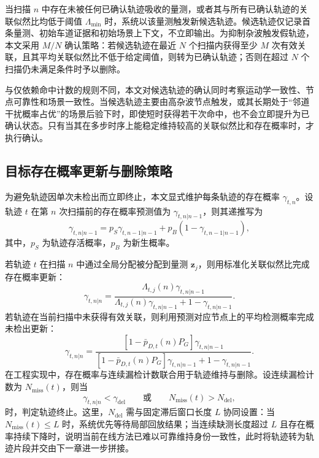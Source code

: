 \documentclass{xdupgthesis}
\begin{document}
当扫描 $n$ 中存在未被任何已确认轨迹吸收的量测，或者其与所有已确认轨迹的关联似然比均低于阈值 $\Lambda_{\min}$ 时，系统以该量测触发新候选轨迹。候选轨迹仅记录首条量测、初始车道证据和初始场景上下文，不立即输出。为抑制杂波触发假轨迹，本文采用 $M/N$ 确认策略：若候选轨迹在最近 $N$ 个扫描内获得至少 $M$ 次有效关联，且其平均关联似然比不低于给定阈值，则转为已确认轨迹；否则在超过 $N$ 个扫描仍未满足条件时予以删除。

与仅依赖命中计数的规则不同，本文对候选轨迹的确认同时考察运动学一致性、节点可靠性和场景一致性。当候选轨迹主要由高杂波节点触发，或其长期处于“邻道干扰概率占优”的场景后验下时，即使短时获得若干次命中，也不会立即提升为已确认状态。只有当其在多步时序上能稳定维持较高的关联似然比和存在概率时，才执行确认。

\subsection{目标存在概率更新与删除策略}

为避免轨迹因单次未检出而立即终止，本文显式维护每条轨迹的存在概率 $\gamma_{t,n}$。设轨迹 $t$ 在第 $n$ 次扫描前的存在概率预测值为 $\gamma_{t,n|n-1}$，则其递推写为
\begin{equation}
	\gamma_{t,n|n-1}=p_S\gamma_{t,n-1|n-1}+p_B\left(1-\gamma_{t,n-1|n-1}\right),
	\label{eq:ch3_exist_predict_v2}
\end{equation}
其中，$p_S$ 为轨迹存活概率，$p_B$ 为新生概率。

若轨迹 $t$ 在扫描 $n$ 中通过全局分配被分配到量测 $\mathbf z_j$，则用标准化关联似然比完成存在概率更新：
\begin{equation}
	\gamma_{t,n|n}=
	\frac{\Lambda_{t,j}(n)\gamma_{t,n|n-1}}{\Lambda_{t,j}(n)\gamma_{t,n|n-1}+1-\gamma_{t,n|n-1}}.
	\label{eq:ch3_exist_hit_v2}
\end{equation}
若轨迹在当前扫描中未获得有效关联，则利用预测对应节点上的平均检测概率完成未检出更新：
\begin{equation}
	\gamma_{t,n|n}=
	\frac{\left[1-\bar p_{D,t}(n)P_G\right]\gamma_{t,n|n-1}}{\left[1-\bar p_{D,t}(n)P_G\right]\gamma_{t,n|n-1}+1-\gamma_{t,n|n-1}}.
	\label{eq:ch3_exist_miss_v2}
\end{equation}
在工程实现中，存在概率与连续漏检计数联合用于轨迹维持与删除。设连续漏检计数为 $N_{\mathrm{miss}}(t)$，则当
\begin{equation}
	\gamma_{t,n|n}<\gamma_{\mathrm{del}}
	\qquad\text{或}\qquad
	N_{\mathrm{miss}}(t)>N_{\mathrm{del}},
	\label{eq:ch3_delete_v2}
\end{equation}
时，判定轨迹终止。这里，$N_{\mathrm{del}}$ 需与固定滞后窗口长度 $L$ 协同设置：当 $N_{\mathrm{miss}}(t)\le L$ 时，系统优先等待局部回放结果；当连续缺测长度超过 $L$ 且存在概率持续下降时，说明当前在线方法已难以可靠维持身份一致性，此时将轨迹转为轨迹片段并交由下一章进一步拼接。
\end{document}
